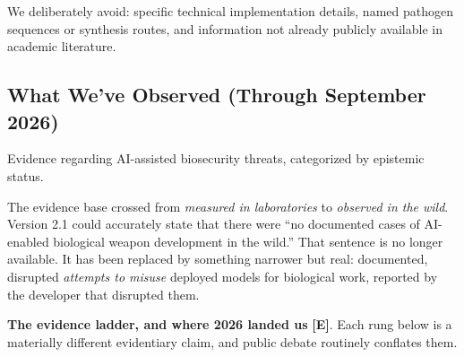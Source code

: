 \documentclass[11pt,letterpaper]{article}
\begin{document}
We deliberately avoid: specific technical implementation details, named pathogen sequences or synthesis routes, and information not already publicly available in academic literature.

\subsection{What We've Observed (Through September 2026)}

Evidence regarding AI-assisted biosecurity threats, categorized by epistemic status.

\begin{keybox}
The evidence base crossed from \textit{measured in laboratories} to \textit{observed in the wild}. Version 2.1 could accurately state that there were ``no documented cases of AI-enabled biological weapon development in the wild.'' That sentence is no longer available. It has been replaced by something narrower but real: documented, disrupted \textit{attempts to misuse} deployed models for biological work, reported by the developer that disrupted them.
\end{keybox}

\textbf{The evidence ladder, and where 2026 landed us} \textbf{[E]}. Each rung below is a materially different evidentiary claim, and public debate routinely conflates them.
\end{document}
